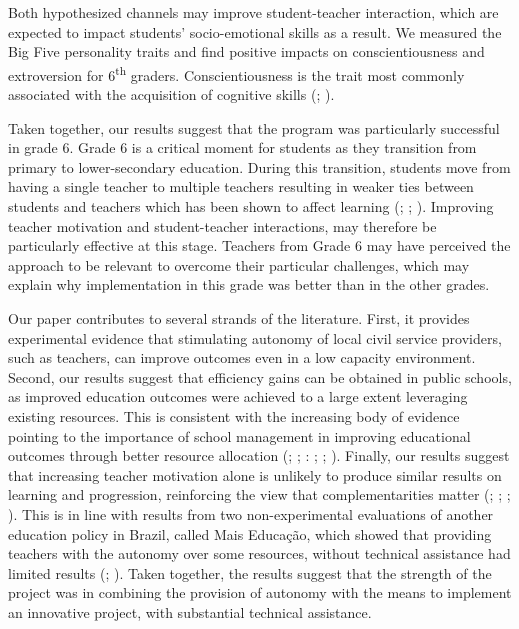\documentclass[11pt,a4paper]{article}
\begin{document}
	Both hypothesized channels may improve student-teacher interaction, which are expected to impact students' socio-emotional skills as a result. We measured the Big Five personality traits and find positive impacts on conscientiousness and extroversion for 6\textsuperscript{th} graders. Conscientiousness is the trait most commonly associated with the acquisition of cognitive skills (\citealp{poropat2009meta}; \citealp{ivcevic2014predicting}). 
	
	Taken together, our results suggest that the program was particularly successful in grade 6. Grade 6 is a critical moment for students as they transition from primary to lower-secondary education. During this transition, students move from having a single teacher to multiple teachers resulting in weaker ties between students and teachers which has been shown to affect learning (\citealp{bedard2005middle}; \citealp{hanewald2013transition}; \citealp{dos2017mais}). Improving teacher motivation and student-teacher interactions, may therefore be particularly effective at this stage. Teachers from Grade 6 may have perceived the approach to be relevant to overcome their particular challenges, which may explain why implementation in this grade was better than in the other grades.    
	
	
	Our paper contributes to several strands of the literature. First, it provides experimental evidence that stimulating autonomy of local civil service providers, such as teachers, can improve outcomes even in a low capacity environment. Second, our results suggest that efficiency gains can be obtained in public schools, as improved education outcomes were achieved to a large extent leveraging existing resources. This is consistent with the increasing body of evidence pointing to the importance of school management in improving educational outcomes through better resource allocation (\citealp{abdulkadirouglu2011accountability}; \citealp{dobbie2013getting}; \citealp{rockoff2012information}: \citealp{taylor2012effect}; \citealp{fryer2014injecting}; \citealp{fryer2017management}). Finally, our results suggest that increasing teacher motivation alone is unlikely to produce similar results on learning and progression, reinforcing the view that complementarities matter (\citealp{WDR2018}; \citealp{gilligan2018educator}; \citealp{andrew2019preschool}; \citealp{mbiti2019inputs}). This is in line with results from two non-experimental evaluations of another education policy in Brazil, called  Mais Educação, which showed that providing teachers with the autonomy over some resources, without technical assistance had limited results (\citealp{almeida2016assessing}; \citealp{de2016impacto}). Taken together, the results suggest that the strength of the project was in combining the provision of autonomy with the means to implement an innovative project, with substantial technical assistance.  
	
\end{document}
